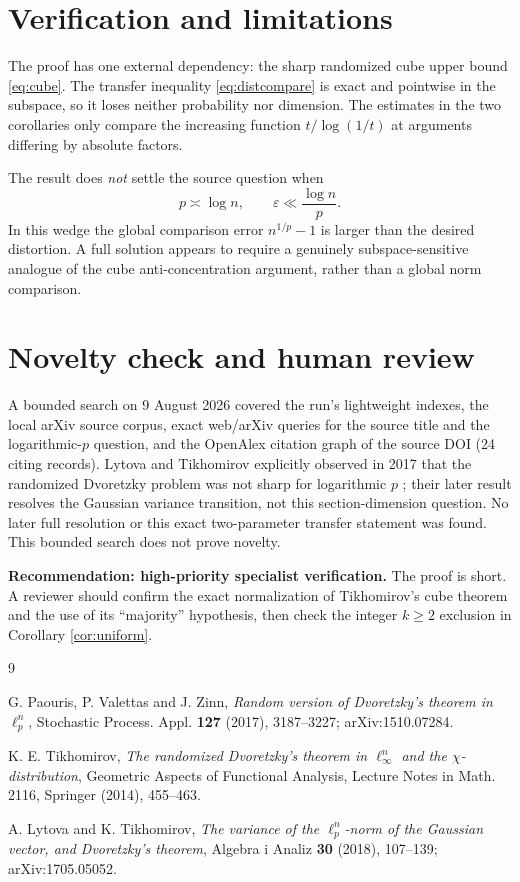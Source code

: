 \documentclass[11pt]{article}
\newcommand{\eps}{\varepsilon}
\begin{document}
\section{Verification and limitations}

The proof has one external dependency: the sharp randomized cube upper bound
\eqref{eq:cube}.  The transfer inequality \eqref{eq:distcompare} is exact and
pointwise in the subspace, so it loses neither probability nor dimension.
The estimates in the two corollaries only compare the increasing function
$t/\log(1/t)$ at arguments differing by absolute factors.

The result does \emph{not} settle the source question when
\[
 p\asymp\log n,
 \qquad
 \eps\ll\frac{\log n}{p}.
\]
In this wedge the global comparison error $n^{1/p}-1$ is larger than the
desired distortion.  A full solution appears to require a genuinely
subspace-sensitive analogue of the cube anti-concentration argument, rather
than a global norm comparison.

\section{Novelty check and human review}

A bounded search on 9 August 2026 covered the run's lightweight indexes, the
local arXiv source corpus, exact web/arXiv queries for the source title and the
logarithmic-$p$ question, and the OpenAlex citation graph of the source DOI
(24 citing records).  Lytova and Tikhomirov explicitly observed in 2017 that
the randomized Dvoretzky problem was not sharp for logarithmic $p$
\cite{LT18}; their later result resolves the Gaussian variance transition,
not this section-dimension question.  No later full resolution or this exact
two-parameter transfer statement was found.  This bounded search does not
prove novelty.

\medskip
\noindent\textbf{Recommendation: high-priority specialist verification.}
The proof is short.  A reviewer should confirm the exact normalization of
Tikhomirov's cube theorem and the use of its ``majority'' hypothesis, then
check the integer $k\ge2$ exclusion in Corollary \ref{cor:uniform}.

\begin{thebibliography}{9}

G. Paouris, P. Valettas and J. Zinn,
\emph{Random version of Dvoretzky's theorem in $\ell_p^n$},
Stochastic Process. Appl. \textbf{127} (2017), 3187--3227;
arXiv:1510.07284.

K. E. Tikhomirov,
\emph{The randomized Dvoretzky's theorem in $\ell_\infty^n$ and the
$\chi$-distribution},
Geometric Aspects of Functional Analysis, Lecture Notes in Math. 2116,
Springer (2014), 455--463.

A. Lytova and K. Tikhomirov,
\emph{The variance of the $\ell_p^n$-norm of the Gaussian vector, and
Dvoretzky's theorem},
Algebra i Analiz \textbf{30} (2018), 107--139;
arXiv:1705.05052.

\end{thebibliography}
\end{document}
